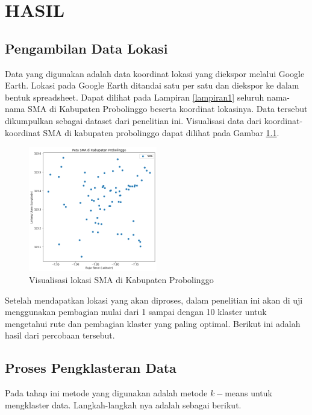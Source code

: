 \chapter{HASIL}

\section{Pengambilan Data Lokasi}

Data yang digunakan adalah data koordinat lokasi yang diekspor melalui Google Earth. Lokasi pada Google Earth ditandai satu per satu dan diekspor ke dalam bentuk spreadsheet. Dapat dilihat pada Lampiran \ref{lampiran1} seluruh nama-nama SMA di Kabupaten Probolinggo beserta koordinat lokasinya. Data tersebut dikumpulkan sebagai dataset dari penelitian ini. Visualisasi data dari koordinat-koordinat SMA di kabupaten probolinggo dapat dilihat pada Gambar \ref{fig:petasma}.

\begin{figure}[H]
  \centering
  \includegraphics[width=0.5\textwidth]{Gambar/peta sma.png}
  \caption{Visualisasi lokasi SMA di Kabupaten Probolinggo}
  \label{fig:petasma}
\end{figure}

Setelah mendapatkan lokasi yang akan diproses, dalam penelitian ini akan di uji menggunakan pembagian mulai dari 1 sampai dengan 10 klaster untuk mengetahui rute dan pembagian klaster yang paling optimal. Berikut ini adalah hasil dari percobaan tersebut.

\section{Proses Pengklasteran Data}

Pada tahap ini metode yang digunakan adalah metode $k-$means untuk mengklaster data. Langkah-langkah nya adalah sebagai berikut.


